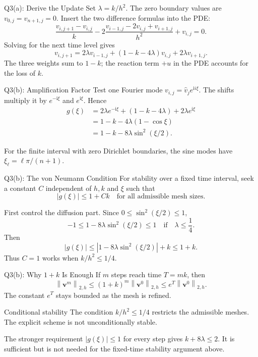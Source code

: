 \documentclass{beamer}
\newcommand{\norm}[1]{\left\|#1\right\|}
\begin{document}
\begin{frame}{Q3(a): Derive the Update}
Set $\lambda=k/h^2$. The zero boundary values are
$v_{0,j}=v_{n+1,j}=0$.
Insert the two difference formulas into the PDE:
\[
\frac{v_{i,j+1}-v_{i,j}}{k}
-2\frac{v_{i-1,j}-2v_{i,j}+v_{i+1,j}}{h^2}
+v_{i,j}=0.
\]
Solving for the next time level gives
\[
\boxed{
v_{i,j+1}
=2\lambda v_{i-1,j}
+(1-k-4\lambda)v_{i,j}
+2\lambda v_{i+1,j}.}
\]
The three weights sum to $1-k$; the reaction term $+u$ in
the PDE accounts for the loss of $k$.
\end{frame}

\begin{frame}{Q3(b): Amplification Factor}
Test one Fourier mode $v_{i,j}=\widehat v_j e^{\mathrm{i}i\xi}$.
The shifts multiply it by $e^{-\mathrm{i}\xi}$ and
$e^{\mathrm{i}\xi}$. Hence
\[
\begin{aligned}
g(\xi)
&=2\lambda e^{-\mathrm{i}\xi}
 +(1-k-4\lambda)+2\lambda e^{\mathrm{i}\xi}\\
&=1-k-4\lambda(1-\cos\xi)\\
&=\boxed{1-k-8\lambda\sin^2(\xi/2)}.
\end{aligned}
\]

For the finite interval with zero Dirichlet boundaries, the sine
modes have $\xi_\ell=\ell\pi/(n+1)$.
\end{frame}

\begin{frame}{Q3(b): The von Neumann Condition}
For stability over a fixed time interval, seek a constant $C$
independent of $h,k$ and $\xi$ such that
\[
|g(\xi)|\leq 1+Ck
\quad\text{for all admissible mesh sizes.}
\]

First control the diffusion part. Since
$0\leq\sin^2(\xi/2)\leq1$,
\[
-1\leq1-8\lambda\sin^2(\xi/2)\leq1
\quad\text{if}\quad \lambda\leq\frac14.
\]
Then
\[
|g(\xi)|
\leq\left|1-8\lambda\sin^2(\xi/2)\right|+k
\leq1+k.
\]
Thus $C=1$ works when $k/h^2\leq1/4$.
\end{frame}

\begin{frame}{Q3(b): Why $1+k$ Is Enough}
If $m$ steps reach time $T=mk$, then
\[
\norm{\bm v^{m}}_{2,h}
\leq (1+k)^m\norm{\bm v^0}_{2,h}
\leq e^T\norm{\bm v^0}_{2,h}.
\]
The constant $e^T$ stays bounded as the mesh is refined.

\begin{block}{Conditional stability}
The condition $k/h^2\leq1/4$ restricts the admissible meshes.
The explicit scheme is not unconditionally stable.
\end{block}

The stronger requirement $|g(\xi)|\leq1$ for every step gives
$k+8\lambda\leq2$. It is sufficient but is not needed for
the fixed-time stability argument above.
\end{frame}
\end{document}
